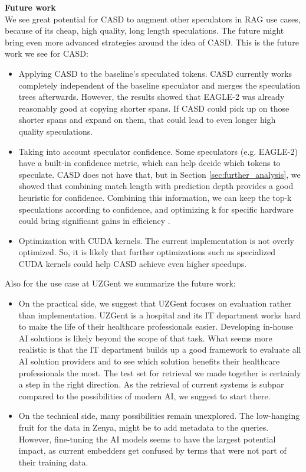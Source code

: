\textbf{Future work}\\
We see great potential for CASD to augment other speculators in RAG use cases, because of its cheap, high quality, long length speculations. The future might bring even more advanced strategies around the idea of CASD. This is the future work we see for CASD:
\begin{itemize}
    \item Applying CASD to the baseline's speculated tokens. CASD currently works completely independent of the baseline speculator and merges the speculation trees afterwards. However, the results showed that EAGLE-2 was already reasonably good at copying shorter spans. If CASD could pick up on those shorter spans and expand on them, that could lead to even longer high quality speculations.
    \item Taking into account speculator confidence. Some speculators (e.g. EAGLE-2) have a built-in confidence metric, which can help decide which tokens to speculate. CASD does not have that, but in Section \ref{sec:further_analysis}, we showed that combining match length with prediction depth provides a good heuristic for confidence. Combining this information, we can keep the top-k speculations according to confidence, and optimizing k for specific hardware could bring significant gains in efficiency \cite{fernandez2025energy}.
    \item Optimization with CUDA kernels. The current implementation is not overly optimized. So, it is likely that further optimizations such as specialized CUDA kernels could help CASD achieve even higher speedups.
\end{itemize}

Also for the use case at UZGent we summarize the future work:
\begin{itemize}
    \item On the practical side, we suggest that UZGent focuses on evaluation rather than implementation. UZGent is a hospital and its IT department works hard to make the life of their healthcare professionals easier. Developing in-house AI solutions is likely beyond the scope of that task. What seems more realistic is that the IT department builds up a good framework to evaluate all AI solution providers and to see which solution benefits their healthcare professionals the most. The test set for retrieval we made together is certainly a step in the right direction. As the retrieval of current systems is subpar compared to the possibilities of modern AI, we suggest to start there.
    \item On the technical side, many possibilities remain unexplored. The low-hanging fruit for the data in Zenya, might be to add metadata to the queries. However, fine-tuning the AI models seems to have the largest potential impact, as current embedders get confused by terms that were not part of their training data.
\end{itemize}
